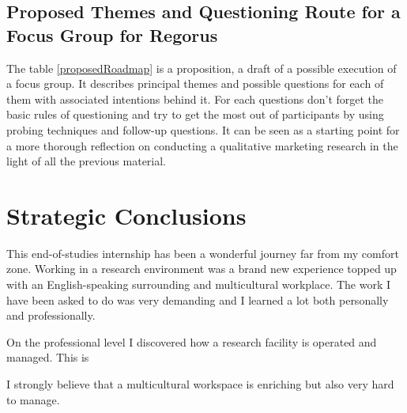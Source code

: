 \documentclass[10pt]{report}
\begin{document}
\subsection{Proposed Themes and Questioning Route for a Focus Group for Regorus}

The table \ref{proposedRoadmap} is a proposition, a draft of a possible execution of a focus group. It describes principal themes and possible questions for each of them with associated intentions behind it. For each questions don't forget the basic rules of questioning and try to get the most out of participants by using probing techniques and follow-up questions. It can be seen as a starting point for a more thorough reflection on conducting a qualitative marketing research in the light of all the previous material.



\renewcommand{\familydefault}{\sfdefault}
\renewcommand{\arraystretch}{1.5}


\newpage
{}

\section*{Strategic Conclusions}
This end-of-studies internship has been a wonderful journey far from my comfort zone. Working in a research environment was a brand new experience topped up with an English-speaking surrounding and multicultural workplace. The work I have been asked to do was very demanding and I learned a lot both personally and professionally.

On the professional level I discovered how a research facility is operated and managed. This is

I strongly believe that a multicultural workspace is enriching but also very hard to manage.

\newpage


\newpage

\pagestyle{plain}

\nocite{*}
\setlength{\bibitemsep}{5pt}

\printbibliography[title={Technological references},keyword={tech}, heading=subbibliography]
\printbibliography[title={Strategic references},keyword={strat}, heading=subbibliography]

\printbibliography[title={Other references}, notkeyword={tech}, notkeyword={strat}, heading=subbibliography]
\end{document}
